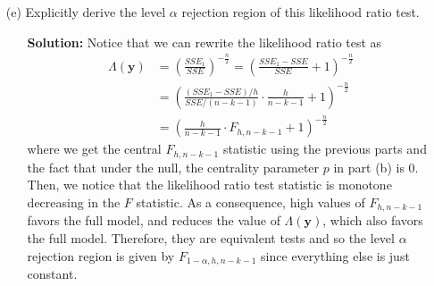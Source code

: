 \documentclass[11pt]{article}
\begin{document}
\begin{itemize}
\begin{itemize}
\item[(e)] Explicitly derive the level $\alpha$ rejection region of this likelihood ratio test.
\begin{itemize}
\item[] \textbf{Solution:}  Notice that we can rewrite the likelihood ratio test as
\begin{align*}
\Lambda(\mathbf{y}) &= \left(\frac{SSE_1}{SSE}\right)^{-\frac{n}{2}} = \left(\frac{SSE_1-SSE}{SSE} + 1\right)^{-\frac{n}{2}} \\
&= \left(\frac{(SSE_1-SSE)/h}{SSE/(n-k-1)}\cdot \frac{h}{n-k-1} + 1\right)^{-\frac{n}{2}} \\
&= \left(\frac{h}{n-k-1}\cdot F_{h,n-k-1} + 1\right)^{-\frac{n}{2}}
\end{align*}
where we get the central $F_{h,n-k-1}$ statistic using the previous parts and the fact that under the null, the centrality parameter $p$ in part (b) is $0$.  Then, we notice that the likelihood ratio test statistic is monotone decreasing in the $F$ statistic.  As a consequence, high values of $F_{h,n-k-1}$ favors the full model, and reduces the value of $\Lambda(\mathbf{y})$, which also favors the full model.  Therefore, they are equivalent tests and so the level $\alpha$ rejection region is given by $F_{1-\alpha,h,n-k-1}$ since everything else is just constant.
\end{itemize}
\end{itemize}

\end{itemize}
\end{document}
